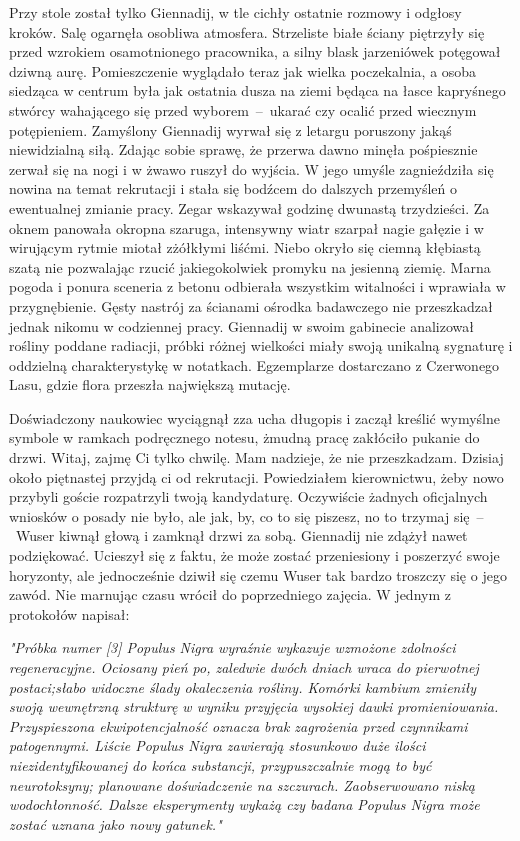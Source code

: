 \documentclass[../MAIN.tex]{subfiles}
\begin{document}
Przy stole został tylko Giennadij, w tle cichły ostatnie
rozmowy i odgłosy kroków. Salę ogarnęła osobliwa atmosfera.
Strzeliste białe ściany piętrzyły się przed wzrokiem
osamotnionego pracownika, a silny blask jarzeniówek potęgował
dziwną aurę. Pomieszczenie wyglądało teraz jak wielka
poczekalnia, a osoba siedząca w centrum była jak ostatnia dusza
na ziemi będąca na łasce kapryśnego stwórcy wahającego się
przed wyborem~--~ukarać czy ocalić przed wiecznym potępieniem.
Zamyślony Giennadij wyrwał się z letargu poruszony jakąś
niewidzialną siłą. Zdając sobie sprawę, że przerwa dawno minęła
pośpiesznie zerwał się na nogi i w żwawo ruszył do wyjścia. W
jego umyśle zagnieździła się nowina na temat rekrutacji i stała
się bodźcem do dalszych przemyśleń o ewentualnej zmianie pracy.
Zegar wskazywał godzinę dwunastą trzydzieści.
%
%
Za oknem panowała okropna szaruga, intensywny wiatr szarpał
nagie gałęzie i w wirującym rytmie miotał zżółkłymi liśćmi.
Niebo okryło się ciemną kłębiastą szatą nie pozwalając rzucić
jakiegokolwiek promyku na jesienną ziemię. Marna pogoda i
ponura sceneria z betonu odbierała wszystkim witalności i
wprawiała w przygnębienie. Gęsty nastrój za ścianami ośrodka
badawczego nie przeszkadzał jednak nikomu w codziennej pracy.
Giennadij w swoim gabinecie analizował rośliny poddane
radiacji, próbki różnej wielkości miały swoją unikalną
sygnaturę i oddzielną charakterystykę w notatkach. Egzemplarze
dostarczano z Czerwonego Lasu, gdzie flora przeszła największą
mutację.

Doświadczony naukowiec wyciągnął zza ucha długopis i zaczął
kreślić wymyślne symbole w ramkach podręcznego notesu, żmudną
pracę zakłóciło pukanie do drzwi.
%
\sx Witaj, zajmę Ci tylko chwilę. Mam nadzieje, że nie
przeszkadzam. Dzisiaj około piętnastej przyjdą ci od
rekrutacji. Powiedziałem kierownictwu, żeby nowo przybyli
goście rozpatrzyli twoją kandydaturę. Oczywiście żadnych
oficjalnych wniosków o posady nie było, ale jak, by, co to się
piszesz, no to trzymaj się~--~Wuser kiwnął głową i zamknął
drzwi za sobą.
\qd
Giennadij nie zdążył nawet podziękować. Ucieszył się z faktu,
że może zostać przeniesiony i poszerzyć swoje horyzonty, ale
jednocześnie dziwił się czemu Wuser tak bardzo troszczy się o
jego zawód. Nie marnując czasu wrócił do poprzedniego zajęcia.
W jednym z protokołów napisał:

\textsl{"Próbka numer [3] Populus Nigra wyraźnie wykazuje
wzmożone
zdolności regeneracyjne. Ociosany pień po, zaledwie dwóch
dniach wraca do pierwotnej postaci;słabo widoczne ślady
okaleczenia rośliny. Komórki kambium zmieniły swoją wewnętrzną
strukturę w wyniku przyjęcia wysokiej dawki promieniowania.
Przyspieszona ekwipotencjalność oznacza brak zagrożenia przed
czynnikami patogennymi. Liście Populus Nigra zawierają
stosunkowo duże ilości niezidentyfikowanej do końca substancji,
przypuszczalnie mogą to być neurotoksyny; planowane
doświadczenie na szczurach. Zaobserwowano niską wodochłonność.
Dalsze eksperymenty wykażą czy badana Populus Nigra może zostać
uznana jako nowy gatunek."}
\end{document}
